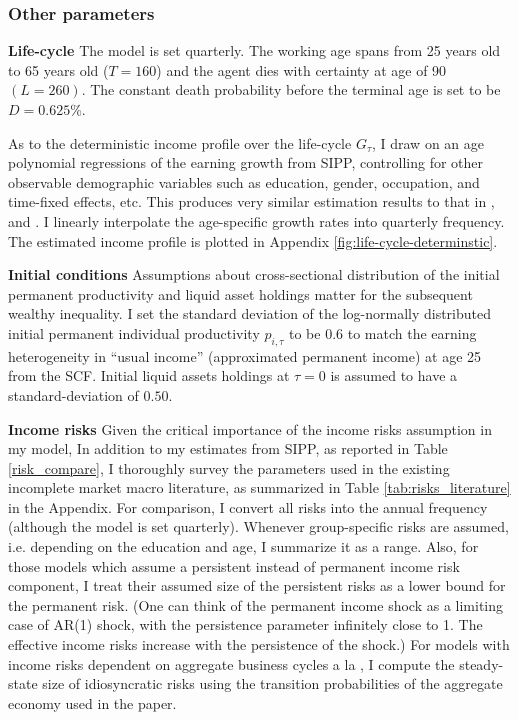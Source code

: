 \subsubsection{Other parameters}


\textbf{Life-cycle} The model is set quarterly. The working age spans from 25 years old to 65 years old ($T=160$) and the agent dies with certainty at age of 90 $(L=260)$. The constant death probability before the terminal age is set to be $D=0.625\%$. 


As to the deterministic income profile over the life-cycle $G_\tau$, I draw on an age polynomial regressions of the earning growth from SIPP, controlling
for other observable demographic variables such as education, gender, occupation, and time-fixed effects, etc. This produces very similar estimation results to that in \cite{gourinchas2002consumption}, \cite{cagetti2003wealth} and \cite{kaplan2014model}. I linearly interpolate the age-specific growth rates into quarterly frequency. The estimated income profile is plotted in Appendix \ref{fig:life-cycle-determinstic}. 

\textbf{Initial conditions} Assumptions about cross-sectional distribution of the initial permanent productivity and liquid asset holdings matter for the subsequent wealthy inequality. I set the standard deviation of the log-normally distributed initial permanent individual productivity $p_{i,\tau}$ to be $0.6$ to match the earning heterogeneity in ``usual income'' (approximated permanent income) at age 25 from the SCF. Initial liquid assets holdings at $\tau=0$ is assumed to have a standard-deviation of $0.50$. %

\textbf{Income risks} Given the critical importance of the income risks assumption in my model, In addition to my estimates from SIPP, as reported in Table \ref{risk_compare}, I thoroughly survey the parameters used in the existing incomplete market macro literature, as summarized in Table \ref{tab:risks_literature} in the Appendix. For comparison, I convert all risks into the annual frequency (although the model is set quarterly). Whenever group-specific risks are assumed, i.e. depending on the education and age, I summarize it as a range. Also, for those models which assume a persistent instead of permanent income risk component, I treat their assumed size of the persistent risks as a lower bound for the permanent risk. (One can think of the permanent income shock as a limiting case of AR(1) shock, with the persistence parameter infinitely close to 1. The effective income risks increase with the persistence of the shock.)  For models with income risks dependent on aggregate business cycles a la \cite{krusell1998income}, I compute the steady-state size of idiosyncratic risks using the transition probabilities of the aggregate economy used in the paper.  

